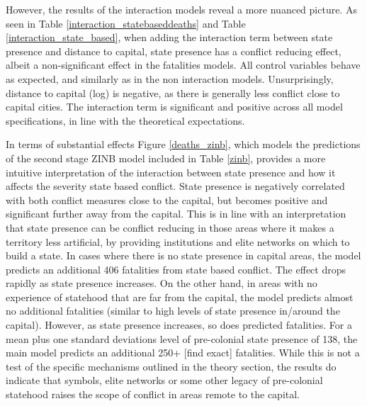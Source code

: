 \documentclass[12pt]{article}
\begin{document}
However, the results of the interaction models reveal a more nuanced picture. As
seen in Table \ref{interaction_statebaseddeaths} and Table
\ref{interaction_state_based}, when adding the interaction term between state
presence and distance to capital, state presence has a conflict reducing effect,
albeit a non-significant effect in the fatalities models. All control variables
behave as expected, and similarly as in the non interaction models.
Unsurprisingly, distance to capital (log) is negative, as there is generally
less conflict close to capital cities. The interaction term is significant
and positive across all model specifications, in line with the theoretical
expectations. 

In terms of substantial effects Figure \ref{deaths_zinb}, which models the
predictions of the second stage ZINB model included in Table \ref{zinb},
provides a more intuitive interpretation of the interaction between state
presence and how it affects the severity state based conflict. State presence is
negatively correlated with both conflict measures close to the capital, but
becomes positive and significant further away from the capital. This is in line
with an interpretation that state presence can be conflict reducing in those
areas where it makes a territory less artificial, by providing institutions and
elite networks on which to build a state. In cases where there is no state
presence in capital areas, the model predicts an additional 406 fatalities from
state based conflict. The effect drops rapidly as state presence increases. On
the other hand, in areas with no experience of statehood that are far from the
capital, the model predicts almost no additional fatalities (similar to high
levels of state presence in/around the capital). However, as state presence
increases, so does predicted fatalities. For a mean plus one standard deviations
level of pre-colonial state presence of 138, the main model predicts an
additional 250+ [find exact]
fatalities. While this is not a test of the specific mechanisms outlined in the
theory section, the results do indicate that symbols, elite networks or
some other legacy of pre-colonial statehood raises the scope of conflict
in areas remote to the capital.

\end{document}
